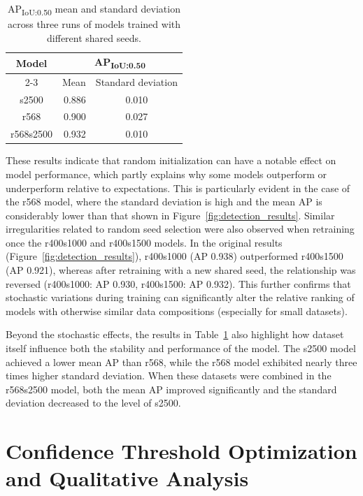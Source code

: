 \begin{table}[htbp]
    \caption{AP\textsubscript{IoU:0.50} mean and standard deviation across three runs of models trained with different shared seeds.}
\label{tab:ap50_seed_stats}
\centering
\renewcommand{\arraystretch}{1.15}
\setlength{\tabcolsep}{8pt}
\begin{tabular}{|c|r|c|}
\hline
\multirow{2}{*}{Model} & \multicolumn{2}{c|}{AP\textsubscript{IoU:0.50}} \\ \cline{2-3}
                       & Mean & Standard deviation \\ \hline
s2500       & 0.886 & 	0.010 \\ \hline
r568        & 0.900 & 	0.027 \\ \hline
r568s2500   & 0.932 & 	0.010 \\ \hline
\end{tabular}
\end{table}

These results indicate that random initialization can have a notable effect on model performance, which partly explains why some models outperform or underperform relative to expectations. This is particularly evident in the case of the r568 model, where the standard deviation is high and the mean AP is considerably lower than that shown in Figure~\ref{fig:detection_results}. Similar irregularities related to random seed selection were also observed when retraining once the r400s1000 and r400s1500 models. In the original results (Figure~\ref{fig:detection_results}), r400s1000 (AP 0.938) outperformed r400s1500 (AP 0.921), whereas after retraining with a new shared seed, the relationship was reversed (r400s1000: AP 0.930, r400s1500: AP 0.932). This further confirms that stochastic variations during training can significantly alter the relative ranking of models with otherwise similar data compositions (especially for small datasets).

Beyond the stochastic effects, the results in Table~\ref{tab:ap50_seed_stats} also highlight how dataset itself influence both the stability and performance of the model. The s2500 model achieved a lower mean AP than r568, while the r568 model exhibited nearly three times higher standard deviation. When these datasets were combined in the r568s2500 model, both the mean AP improved significantly and the standard deviation decreased to the level of s2500.

\section{Confidence Threshold Optimization and Qualitative Analysis}

